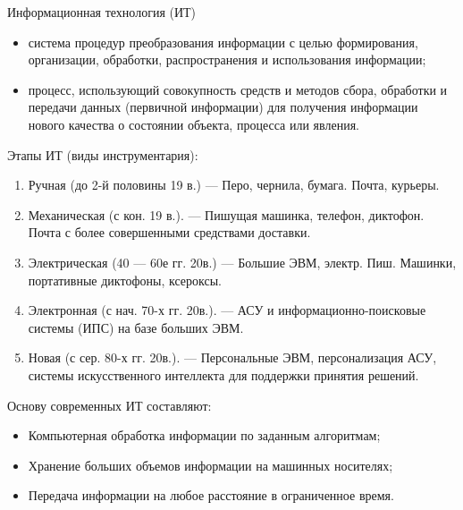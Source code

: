 \documentclass[a4paper]{article}
\begin{document}
  Информационная технология (ИТ)
  \begin{itemize}
      \item система процедур преобразования информации с целью формирования, организации, обработки, распространения и использования информации;
      \item процесс, использующий совокупность средств и методов сбора, обработки и передачи данных (первичной информации) для получения информации нового качества о состоянии объекта, процесса или явления.
\end{itemize}
Этапы ИТ (виды инструментария):
\begin{enumerate}
  \item Ручная  (до 2-й половины 19 в.) --- Перо, чернила, бумага. Почта, курьеры.
  \item Механическая (с кон. 19 в.). --- Пишущая машинка, телефон, диктофон. Почта с более совершенными средствами доставки.
  \item Электрическая (40 --- 60е гг. 20в.) --- Большие ЭВМ, электр. Пиш. Машинки, портативные диктофоны, ксероксы.
  \item  Электронная (с нач. 70-х гг. 20в.). --- АСУ и информационно-поисковые системы (ИПС) на базе больших ЭВМ.
  \item Новая (с сер. 80-х гг. 20в.). --- Персональные ЭВМ, персонализация АСУ, системы искусственного интеллекта для поддержки принятия решений.
\end{enumerate}

Основу современных ИТ составляют:
\begin{itemize}
  \item Компьютерная обработка информации по заданным алгоритмам;
  \item Хранение больших объемов информации на машинных носителях;
  \item Передача информации на любое расстояние в ограниченное время.
\end{itemize}
\end{document}
